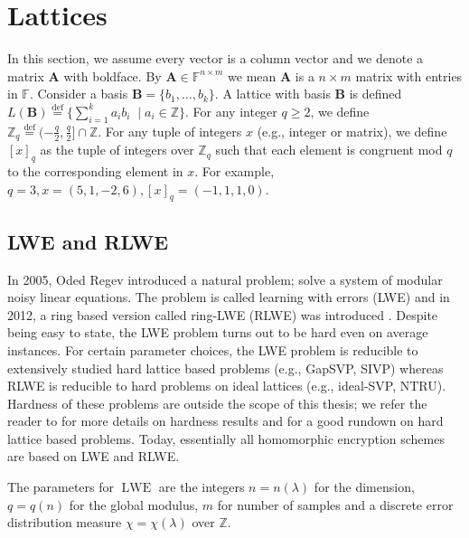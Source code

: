\chapter{Lattices}\label{sec:lattices}

In this section, we assume every vector is a column vector and we denote a matrix $\textbf{A}$ with boldface. By $\textbf{A} \in \mathbb{F}^{n \times m}$ we mean $\textbf{A}$ is a $n \times m$ matrix with entries in $\mathbb{F}$. Consider a basis $\textbf{B} = \{b_1, \dots, b_k\}$. A lattice with basis $\textbf{B}$ is defined $L(\textbf{B}) \stackrel{\mathrm{def}}{=} \{ \sum_{i=1}^k a_i b_i \; \mid a_i \in \mathbb{Z}\}$. For any integer $q \geq 2$, we define $\mathbb{Z}_q \stackrel{\mathrm{def}}{=} (-\frac{q}{2}, \frac{q}{2}] \cap \mathbb{Z}$. For any tuple of integers $x$ (e.g., integer or matrix), we define $[x]_q$ as the tuple of integers over $\mathbb{Z}_q$ such that each element is congruent mod $q$ to the corresponding element in $x$. For example, $q = 3, x = (5,1,-2,6), [x]_q = (-1,1,1,0)$.

\section{LWE and RLWE}\label{subsec:LWE}
In 2005, Oded Regev introduced \cite{Reg05-LWE} a natural problem; solve a system of modular noisy linear equations. The problem is called learning with errors (LWE) and in 2012, a ring based version called ring-LWE (RLWE) was introduced \cite{RLWE}. Despite being easy to state, the LWE problem turns out to be hard even on average instances. For certain parameter choices, the LWE problem is reducible to extensively studied hard lattice based problems (e.g., GapSVP, SIVP) whereas RLWE is reducible to hard problems on ideal lattices (e.g., ideal-SVP, NTRU). Hardness of these problems are outside the scope of this thesis; we refer the reader to \cite{Reg05-LWE, LWE-classical-reduction, LWE-hardness, RLWE} for more details on hardness results and \cite{Pei16-decade} for a good rundown on hard lattice based problems. Today, essentially all homomorphic encryption schemes are based on LWE and RLWE.

The parameters for $\operatorname{LWE}$ are the integers $n = n(\lambda)$ for the dimension, $q = q(n)$ for the global modulus, $m$ for number of samples and a discrete error distribution measure $\chi = \chi(\lambda)$ over $\mathbb{Z}$.

